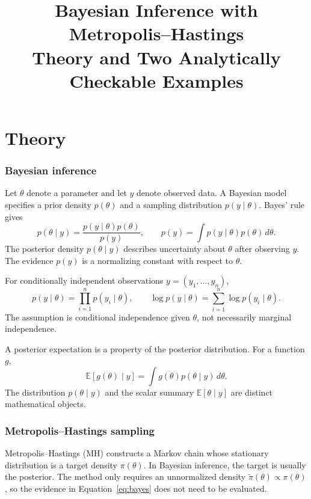 \documentclass[11pt,a4paper]{article}
\title{Bayesian Inference with Metropolis--Hastings\\[0.4em]\large Theory and Two Analytically Checkable Examples}
\author{}
\date{}
\begin{document}
\maketitle
\tableofcontents
\newpage

\part{Theory}

\section{Bayesian inference}
Let \(\theta\) denote a parameter and let \(y\) denote observed data. A Bayesian model specifies a prior density \(p(\theta)\) and a sampling distribution \(p(y\mid\theta)\). Bayes' rule gives
\begin{equation}
 p(\theta\mid y)=\frac{p(y\mid\theta)p(\theta)}{p(y)},
 \qquad
 p(y)=\int p(y\mid\theta)p(\theta)\,d\theta.
 \label{eq:bayes}
\end{equation}
The posterior density \(p(\theta\mid y)\) describes uncertainty about \(\theta\) after observing \(y\). The evidence \(p(y)\) is a normalizing constant with respect to \(\theta\).

For conditionally independent observations \(y=(y_1,\ldots,y_n)\),
\begin{equation}
 p(y\mid\theta)=\prod_{i=1}^{n}p(y_i\mid\theta),
 \qquad
 \log p(y\mid\theta)=\sum_{i=1}^{n}\log p(y_i\mid\theta).
 \label{eq:iidlikelihood}
\end{equation}
The assumption is conditional independence given \(\theta\), not necessarily marginal independence.

A posterior expectation is a property of the posterior distribution. For a function \(g\),
\begin{equation}
 \mathbb{E}[g(\theta)\mid y]=\int g(\theta)p(\theta\mid y)\,d\theta.
 \label{eq:postexpectation}
\end{equation}
The distribution \(p(\theta\mid y)\) and the scalar summary \(\mathbb{E}[\theta\mid y]\) are distinct mathematical objects.

\section{Metropolis--Hastings sampling}
Metropolis--Hastings (MH) constructs a Markov chain whose stationary distribution is a target density \(\pi(\theta)\). In Bayesian inference, the target is usually the posterior. The method only requires an unnormalized density \(\widetilde\pi(\theta)\propto\pi(\theta)\), so the evidence in Equation~\eqref{eq:bayes} does not need to be evaluated.
\end{document}
